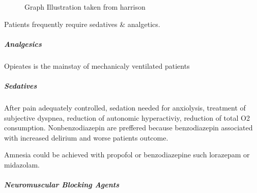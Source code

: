 \documentclass[
  letterpaper,
  DIV=11,
  numbers=noendperiod]{scrreprt}
\let\oldsubparagraph\subparagraph
\renewcommand{\subparagraph}[1]{\oldsubparagraph{#1}\mbox{}}
\begin{document}
\begin{figure}


\caption{\label{fig-airwayresistance}Graph Illustration taken from
harrison}

\end{figure}%

Patients frequently require sedatives \& analgetics.

\subparagraph{Analgesics}\label{analgesics}

Opieates is the mainstay of mechanicaly ventilated patients

\subparagraph{Sedatives}\label{sedatives}

After pain adequately controlled, sedation needed for anxiolysis,
treatment of subjective dyspnea, reduction of autonomic hyperactiviy,
reduction of total O2 consumption. Nonbenzodiazepin are preffered
because benzodiazepin associated with increased delirium and worse
patients outcome.

Amnesia could be achieved with propofol or benzodiazepine such lorazepam
or midazolam.

\subparagraph{Neuromuscular Blocking
Agents}\label{neuromuscular-blocking-agents}
\end{document}
